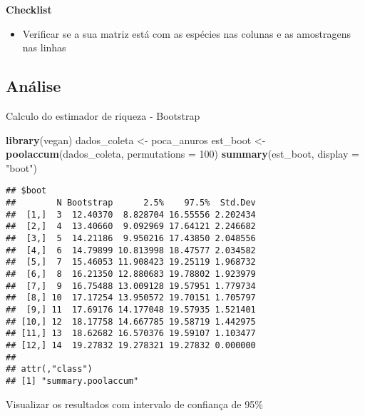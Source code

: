 \documentclass[
]{book}
\newenvironment{Shaded}{\begin{snugshade}}{\end{snugshade}}
\newcommand{\DataTypeTok}[1]{\textcolor[rgb]{0.13,0.29,0.53}{#1}}
\newcommand{\DecValTok}[1]{\textcolor[rgb]{0.00,0.00,0.81}{#1}}
\newcommand{\KeywordTok}[1]{\textcolor[rgb]{0.13,0.29,0.53}{\textbf{#1}}}
\newcommand{\NormalTok}[1]{#1}
\newcommand{\StringTok}[1]{\textcolor[rgb]{0.31,0.60,0.02}{#1}}
\providecommand{\tightlist}{%
  \setlength{\itemsep}{0pt}\setlength{\parskip}{0pt}}
\begin{document}
\textbf{Checklist}

\begin{itemize}
\tightlist
\item
  Verificar se a sua matriz está com as espécies nas colunas e as amostragens nas linhas
\end{itemize}

\hypertarget{anuxe1lise-5}{%
\subsection{Análise}\label{anuxe1lise-5}}

Calculo do estimador de riqueza - Bootstrap

\begin{Shaded}
\begin{Highlighting}[]
\KeywordTok{library}\NormalTok{(vegan)}
\NormalTok{dados_coleta <-}\StringTok{ }\NormalTok{poca_anuros}
\NormalTok{est_boot <-}\StringTok{ }\KeywordTok{poolaccum}\NormalTok{(dados_coleta, }\DataTypeTok{permutations =} \DecValTok{100}\NormalTok{)}
\KeywordTok{summary}\NormalTok{(est_boot, }\DataTypeTok{display =} \StringTok{"boot"}\NormalTok{)}
\end{Highlighting}
\end{Shaded}

\begin{verbatim}
## $boot
##        N Bootstrap      2.5%    97.5%  Std.Dev
##  [1,]  3  12.40370  8.828704 16.55556 2.202434
##  [2,]  4  13.40660  9.092969 17.64121 2.246682
##  [3,]  5  14.21186  9.950216 17.43850 2.048556
##  [4,]  6  14.79899 10.813998 18.47577 2.034582
##  [5,]  7  15.46053 11.908423 19.25119 1.968732
##  [6,]  8  16.21350 12.880683 19.78802 1.923979
##  [7,]  9  16.75488 13.009128 19.57951 1.779734
##  [8,] 10  17.17254 13.950572 19.70151 1.705797
##  [9,] 11  17.69176 14.177048 19.57935 1.521401
## [10,] 12  18.17758 14.667785 19.58719 1.442975
## [11,] 13  18.62682 16.570376 19.59107 1.103477
## [12,] 14  19.27832 19.278321 19.27832 0.000000
## 
## attr(,"class")
## [1] "summary.poolaccum"
\end{verbatim}

Visualizar os resultados com intervalo de confiança de 95\%
\end{document}
